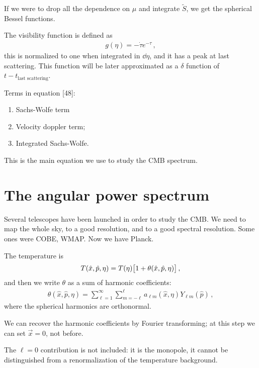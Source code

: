 \documentclass[main.tex]{subfiles}
\begin{document}

If we were to drop all the dependence on \(\mu \) and integrate \(\widetilde{S}\), we get the spherical Bessel functions. 

The visibility function is defined as 
%
\begin{align}
g(\eta ) = - \dot{\tau} e^{-\tau }
\,,
\end{align}
%
this is normalized to one when integrated in \(\dd{\eta }\), and it has a peak at last scattering. 
This function will be later approximated as a \(\delta \) function of \(t - t _{\text{last scattering}}\). 

Terms in equation [48]: 
\begin{enumerate}
    \item Sachs-Wolfe term
    \item Velocity doppler term;
    \item Integrated Sachs-Wolfe. 
\end{enumerate}

This is the main equation we use to study the CMB spectrum. 

\section{The angular power spectrum}

Several telescopes have been launched in order to study the CMB. We need to map the whole sky, to a good resolution, and to a good spectral resolution.
Some ones were COBE, WMAP. Now we have Planck. 

The temperature is 
%
\begin{align}
T (\hat{x}, \hat{p}, \eta ) = T(\eta ) \qty[1 + \theta (\hat{x}, \hat{p}, \eta )]
\,,
\end{align}
%
and then we write \(\theta \) as a sum of harmonic coefficients: 
%
\begin{align}
\theta (\hat{x}, \hat{p}, \eta ) = \sum _{\ell=1}^{ \infty }
\sum _{m = -\ell}^{\ell} a_{ \ell m } (\hat{x}, \eta )  Y_{\ell m } (\hat{p})
\,,
\end{align}
%
where the spherical harmonics are orthonormal. 

We can recover the harmonic coefficients by Fourier transforming; at this step we can set \(\vec{x} =0 \), not before.  

The \(\ell = 0\) contribution is not included: it is the monopole, it cannot be distinguished from a renormalization of the temperature background. 
\end{document}
